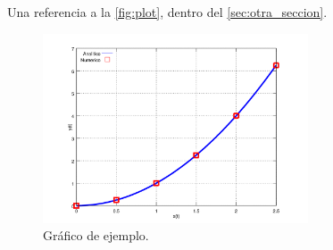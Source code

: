 Una referencia a la \autoref{fig:plot}, dentro del \autoref{sec:otra_seccion}.

\begin{figure}[h]
	\centering
	\includegraphics[width=0.7\textwidth]{Figuras/capitulo_2/x_vs_y}
	\caption{Gráfico de ejemplo.}
	\label{fig:plot}
\end{figure}

